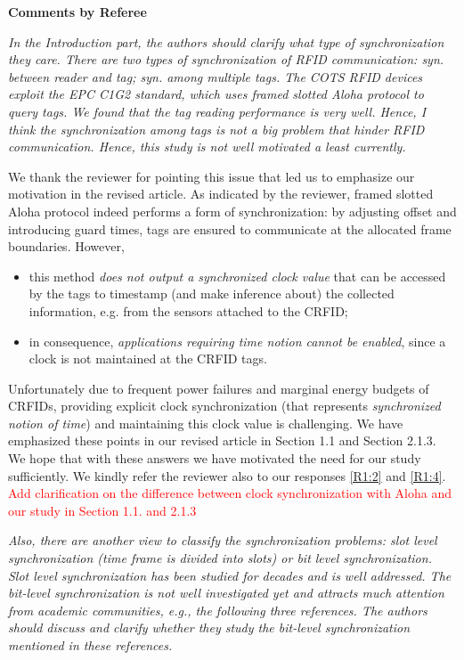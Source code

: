 \documentclass[10pt]{article}
\newcommand{\referee}[1]{
	{\item \color{OliveGreen} \emph{{#1}}}
	\label{R\therefereeCounter:\arabic{enumi}}
}
\newcommand{\response}[1]{{\color{blue} #1}}
\newcounter{refereeCounter}
\newenvironment{responses}{%
\refstepcounter{refereeCounter}%
\textbf{\large Comments by Referee \therefereeCounter}
\begin{enumerate}%
\renewcommand{\labelenumi}{\textbf{[R\therefereeCounter :\,\arabic{enumi}]}} %
}{\end{enumerate}}
\begin{document}
\begin{responses}
 
\referee{In the Introduction part, the authors should clarify what type of synchronization they care. There are two types of synchronization of RFID communication: syn. between reader and tag; syn. among multiple tags. The COTS RFID devices exploit the EPC C1G2 standard, which uses framed slotted Aloha protocol to query tags. We found that the tag reading performance is very well. Hence, I think the synchronization among tags is not a big problem that hinder RFID communication. Hence, this study is not well motivated a least currently.}

\response{We thank the reviewer for pointing this issue that led us to emphasize our motivation in the revised article. As indicated by the reviewer, framed slotted Aloha protocol indeed performs a form of synchronization: by adjusting offset and introducing guard times, tags are ensured to communicate at the allocated frame boundaries. However, 

\begin{itemize}
	\item this method \emph{does not output a synchronized clock value} that can be accessed by the tags to timestamp (and make inference about) the collected information, e.g. from the sensors attached to the CRFID;
	\item in consequence, \emph{applications requiring time notion cannot be enabled}, since a clock is not maintained at the CRFID tags.
\end{itemize}

Unfortunately due to frequent power failures and marginal energy budgets of CRFIDs, providing explicit clock synchronization (that represents \emph{synchronized notion of time}) and maintaining this clock value is challenging. We have emphasized these points in our revised article in Section 1.1 and Section 2.1.3. We hope that with these answers we have motivated the need for our study sufficiently. We kindly refer the reviewer also to our responses \hyperref[R1:2]{[R1:2]} and \hyperref[R1:4]{[R1:4]}. \textcolor{red}{Add clarification on the difference between clock synchronization with Aloha and our study in Section 1.1. and 2.1.3}}

\referee{Also, there are another view to classify the synchronization problems: slot level synchronization (time frame is divided into slots) or bit level synchronization. Slot level synchronization has been studied for decades and is well addressed. The bit-level synchronization is not well investigated yet and attracts much attention from academic communities, e.g., the following three references. The authors should discuss and clarify whether they study the bit-level synchronization mentioned in these references.}


\end{responses}
\end{document}
